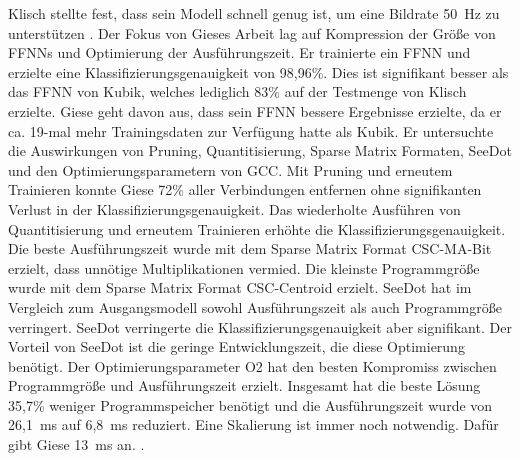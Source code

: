 Klisch stellte fest, dass sein Modell schnell genug ist, um eine Bildrate 50~Hz zu unterstützen \cite{klischThesis}.
\newline
\newline
Der Fokus von Gieses Arbeit lag auf Kompression der Größe von FFNNs und Optimierung der Ausführungszeit. Er trainierte ein FFNN und erzielte eine Klassifizierungsgenauigkeit von 98,96\%.
Dies ist signifikant besser als das FFNN von Kubik, welches lediglich 83\% auf der Testmenge von Klisch erzielte.
Giese geht davon aus, dass sein FFNN bessere Ergebnisse erzielte, da er ca. 19-mal mehr Trainingsdaten zur Verfügung hatte als Kubik. Er untersuchte die Auswirkungen von Pruning, Quantitisierung, Sparse Matrix Formaten, SeeDot und
den Optimierungsparametern von GCC. Mit Pruning und erneutem Trainieren konnte Giese 72\% aller Verbindungen entfernen ohne signifikanten Verlust in der Klassifizierungsgenauigkeit. Das wiederholte Ausführen von Quantitisierung und
erneutem Trainieren erhöhte die Klassifizierungsgenauigkeit. Die beste Ausführungszeit wurde mit dem Sparse Matrix Format CSC-MA-Bit erzielt, dass unnötige Multiplikationen vermied. Die kleinste Programmgröße wurde mit dem
Sparse Matrix Format CSC-Centroid erzielt.
\newline
\newline
SeeDot hat im Vergleich zum Ausgangsmodell sowohl Ausführungszeit als auch Programmgröße verringert. SeeDot verringerte die Klassifizierungsgenauigkeit aber signifikant. Der Vorteil von SeeDot
ist die geringe Entwicklungszeit, die diese Optimierung benötigt. Der Optimierungsparameter O2 hat den besten Kompromiss zwischen Programmgröße und Ausführungszeit erzielt. Insgesamt hat die beste Lösung 35,7\% weniger Programmspeicher
benötigt und die Ausführungszeit wurde von 26,1~ms auf 6,8~ms reduziert. Eine Skalierung ist immer noch notwendig. Dafür gibt Giese 13~ms an. \cite{gieseThesis}.
